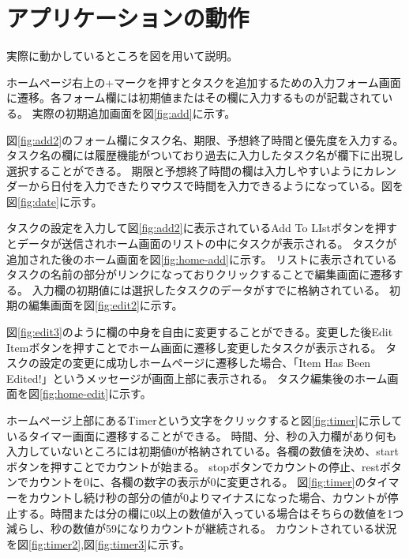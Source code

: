 \chapter{アプリケーションの動作}
\label{cha:motion}

実際に動かしているところを図を用いて説明。

ホームページ右上の+マークを押すとタスクを追加するための入力フォーム画面に遷移。各フォーム欄には初期値またはその欄に入力するものが記載されている。
実際の初期追加画面を図\ref{fig:add}に示す。

\newpage

図\ref{fig:add2}のフォーム欄にタスク名、期限、予想終了時間と優先度を入力する。タスク名の欄には履歴機能がついており過去に入力したタスク名が欄下に出現し選択することができる。
期限と予想終了時間の欄は入力しやすいようにカレンダーから日付を入力できたりマウスで時間を入力できるようになっている。図を図\ref{fig:date}に示す。

\newpage


\newpage
タスクの設定を入力して図\ref{fig:add2}に表示されているAdd To LIstボタンを押すとデータが送信されホーム画面のリストの中にタスクが表示される。
タスクが追加された後のホーム画面を図\ref{fig:home-add}に示す。
リストに表示されているタスクの名前の部分がリンクになっておりクリックすることで編集画面に遷移する。
入力欄の初期値には選択したタスクのデータがすでに格納されている。
初期の編集画面を図\ref{fig:edit2}に示す。
\newpage


\newpage
図\ref{fig:edit3}のように欄の中身を自由に変更することができる。変更した後Edit Itemボタンを押すことでホーム画面に遷移し変更したタスクが表示される。
タスクの設定の変更に成功しホームページに遷移した場合、「Item Has Been Edited!」というメッセージが画面上部に表示される。
タスク編集後のホーム画面を図\ref{fig:home-edit}に示す。
\newpage


\newpage
ホームページ上部にあるTimerという文字をクリックすると図\ref{fig:timer}に示しているタイマー画面に遷移することができる。
時間、分、秒の入力欄があり何も入力していないところには初期値0が格納されている。各欄の数値を決め、startボタンを押すことでカウントが始まる。
stopボタンでカウントの停止、restボタンでカウントを0に、各欄の数字の表示が0に変更される。
\newpage
{}
図\ref{fig:timer}のタイマーをカウントし続け秒の部分の値が0よりマイナスになった場合、カウントが停止する。時間または分の欄に0以上の数値が入っている場合はそちらの数値を1つ減らし、秒の数値が59になりカウントが継続される。
カウントされている状況を図\ref{fig:timer2},図\ref{fig:timer3}に示す。